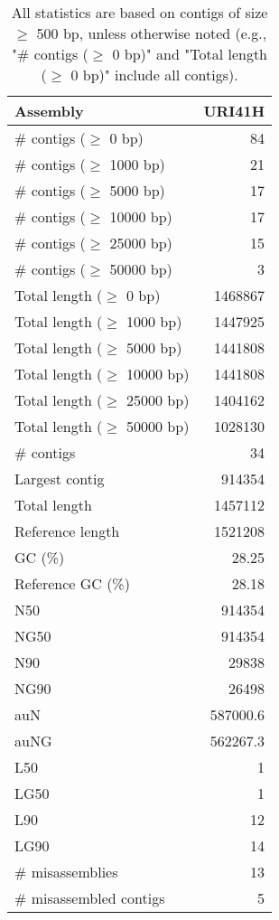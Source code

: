\documentclass[12pt,a4paper]{article}
\begin{document}
\begin{table}[ht]
\begin{center}
\caption{All statistics are based on contigs of size $\geq$ 500 bp, unless otherwise noted (e.g., "\# contigs ($\geq$ 0 bp)" and "Total length ($\geq$ 0 bp)" include all contigs).}
\begin{tabular}{|l*{1}{|r}|}
\hline
Assembly & URI41H \\ \hline
\# contigs ($\geq$ 0 bp) & 84 \\ \hline
\# contigs ($\geq$ 1000 bp) & 21 \\ \hline
\# contigs ($\geq$ 5000 bp) & 17 \\ \hline
\# contigs ($\geq$ 10000 bp) & 17 \\ \hline
\# contigs ($\geq$ 25000 bp) & 15 \\ \hline
\# contigs ($\geq$ 50000 bp) & 3 \\ \hline
Total length ($\geq$ 0 bp) & 1468867 \\ \hline
Total length ($\geq$ 1000 bp) & 1447925 \\ \hline
Total length ($\geq$ 5000 bp) & 1441808 \\ \hline
Total length ($\geq$ 10000 bp) & 1441808 \\ \hline
Total length ($\geq$ 25000 bp) & 1404162 \\ \hline
Total length ($\geq$ 50000 bp) & 1028130 \\ \hline
\# contigs & 34 \\ \hline
Largest contig & 914354 \\ \hline
Total length & 1457112 \\ \hline
Reference length & 1521208 \\ \hline
GC (\%) & 28.25 \\ \hline
Reference GC (\%) & 28.18 \\ \hline
N50 & 914354 \\ \hline
NG50 & 914354 \\ \hline
N90 & 29838 \\ \hline
NG90 & 26498 \\ \hline
auN & 587000.6 \\ \hline
auNG & 562267.3 \\ \hline
L50 & 1 \\ \hline
LG50 & 1 \\ \hline
L90 & 12 \\ \hline
LG90 & 14 \\ \hline
\# misassemblies & 13 \\ \hline
\# misassembled contigs & 5 \\ \hline

\end{tabular}
\end{center}
\end{table}
\end{document}
